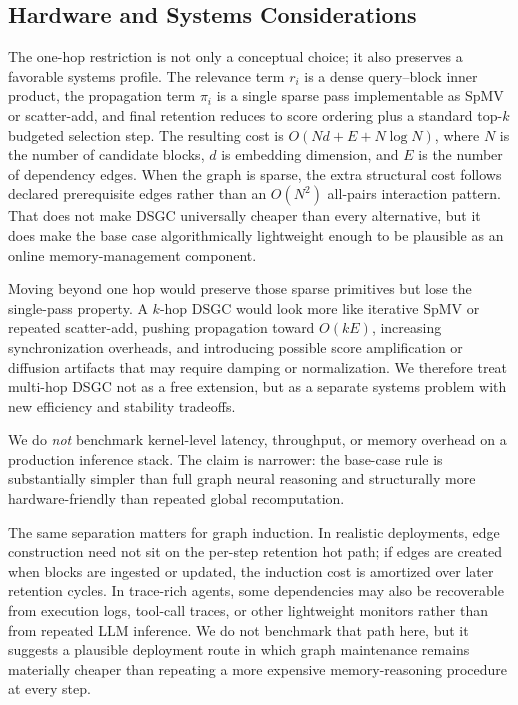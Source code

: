 \documentclass[10pt]{article}
\begin{document}
\subsection{Hardware and Systems Considerations}

The one-hop restriction is not only a conceptual choice; it also preserves a favorable systems profile. The relevance term $r_i$ is a dense query--block inner product, the propagation term $\pi_i$ is a single sparse pass implementable as SpMV or scatter-add, and final retention reduces to score ordering plus a standard top-$k$ budgeted selection step. The resulting cost is $O(Nd + E + N \log N)$, where $N$ is the number of candidate blocks, $d$ is embedding dimension, and $E$ is the number of dependency edges. When the graph is sparse, the extra structural cost follows declared prerequisite edges rather than an $O(N^2)$ all-pairs interaction pattern. That does not make DSGC universally cheaper than every alternative, but it does make the base case algorithmically lightweight enough to be plausible as an online memory-management component.

Moving beyond one hop would preserve those sparse primitives but lose the single-pass property. A $k$-hop DSGC would look more like iterative SpMV or repeated scatter-add, pushing propagation toward $O(kE)$, increasing synchronization overheads, and introducing possible score amplification or diffusion artifacts that may require damping or normalization. We therefore treat multi-hop DSGC not as a free extension, but as a separate systems problem with new efficiency and stability tradeoffs.

We do \emph{not} benchmark kernel-level latency, throughput, or memory overhead on a production inference stack. The claim is narrower: the base-case rule is substantially simpler than full graph neural reasoning and structurally more hardware-friendly than repeated global recomputation.

The same separation matters for graph induction. In realistic deployments, edge construction need not sit on the per-step retention hot path; if edges are created when blocks are ingested or updated, the induction cost is amortized over later retention cycles. In trace-rich agents, some dependencies may also be recoverable from execution logs, tool-call traces, or other lightweight monitors rather than from repeated LLM inference. We do not benchmark that path here, but it suggests a plausible deployment route in which graph maintenance remains materially cheaper than repeating a more expensive memory-reasoning procedure at every step.
\end{document}
